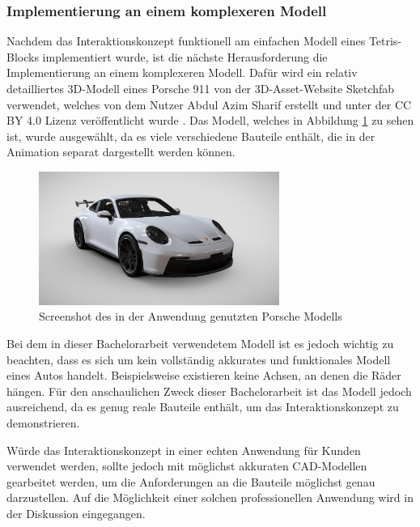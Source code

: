 \newpage

\subsubsection{Implementierung an einem komplexeren Modell}

Nachdem das Interaktionskonzept funktionell am einfachen Modell eines Tetris-Blocks implementiert wurde, ist die nächste Herausforderung die Implementierung an einem komplexeren Modell.
Dafür wird ein relativ detailliertes 3D-Modell eines Porsche 911 von der 3D-Asset-Website Sketchfab verwendet, welches von dem Nutzer Abdul Azim Sharif erstellt und unter der CC BY 4.0 Lizenz veröffentlicht wurde \autocite[][]{SketchfabPorsche}.
Das Modell, welches in Abbildung \ref{fig:porsche} zu sehen ist, wurde ausgewählt, da es viele verschiedene Bauteile enthält, die in der Animation separat dargestellt werden können.

\begin{figure}[H]
    \centering
    \includegraphics[width=0.7\textwidth]{images/PorscheModell.png}
    \caption{Screenshot des in der Anwendung genutzten Porsche Modells}
    \label{fig:porsche}
\end{figure}

Bei dem in dieser Bachelorarbeit verwendetem Modell ist es jedoch wichtig zu beachten, dass es sich um kein vollständig akkurates und funktionales Modell eines Autos handelt.
Beispielsweise existieren keine Achsen, an denen die Räder hängen.
Für den anschaulichen Zweck dieser Bachelorarbeit ist das Modell jedoch ausreichend, da es genug \glqq{}reale\grqq{}  Bauteile enthält, um das Interaktionskonzept zu demonstrieren.

Würde das Interaktionskonzept in einer echten Anwendung für Kunden verwendet werden, sollte jedoch mit möglichst akkuraten CAD-Modellen gearbeitet werden, um die Anforderungen an die Bauteile möglichst genau darzustellen.
Auf die Möglichkeit einer solchen professionellen Anwendung wird in der Diskussion eingegangen.

